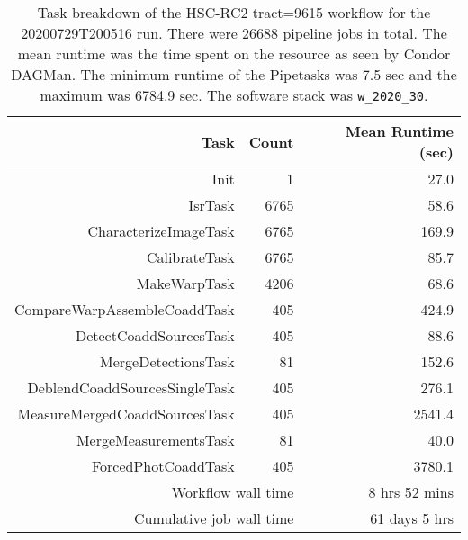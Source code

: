 \begin{table}
\centering
\begin{tabular} {|r|r|r|}
\hline
{Task}&{Count}    &{Mean Runtime (sec)} \\ \hline
Init & 1 & 27.0 \\
IsrTask & 6765 & 58.6 \\
CharacterizeImageTask & 6765 & 169.9 \\
CalibrateTask & 6765 & 85.7 \\
MakeWarpTask & 4206 & 68.6 \\
CompareWarpAssembleCoaddTask & 405 & 424.9 \\
DetectCoaddSourcesTask & 405 & 88.6 \\
MergeDetectionsTask & 81 & 152.6 \\
DeblendCoaddSourcesSingleTask & 405 & 276.1 \\
MeasureMergedCoaddSourcesTask & 405 & 2541.4 \\
MergeMeasurementsTask & 81 & 40.0 \\
ForcedPhotCoaddTask & 405 & 3780.1 \\
\hline
\multicolumn{2}{|r|}{Workflow wall time} & 8 hrs 52 mins \\
\hline
\multicolumn{2}{|r|}{Cumulative job wall time} & 61 days 5 hrs \\
\hline
\end{tabular}
\caption{Task breakdown of the HSC-RC2 tract=9615 workflow for the 20200729T200516 run.
There were 26688 pipeline jobs in total.
The mean runtime was the time spent on the resource as seen by Condor DAGMan.
The minimum runtime of the Pipetasks was 7.5 sec and the maximum was 6784.9 sec.
The software stack was \texttt{w\_2020\_30}.
}
\label{tab:taskBreakdownW30}
\end{table}
